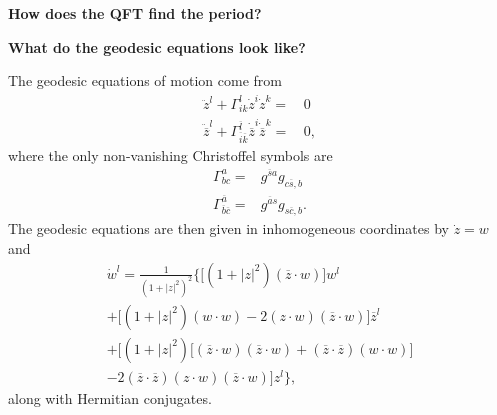 \documentclass{slides}
\begin{document}
\pagebreak



\begin{center}
\textbf{How does the QFT find the period?}
\end{center}

\pagebreak


\begin{center}
\textbf{What do the geodesic equations look like?}
\end{center}

The geodesic equations of motion come from
\begin{equation*}
\begin{split}
    \ddot{z}^l + \Gamma^l_{ik}\dot{z}^i\dot{z}^k =&\, 0\\
    \ddot{\overline{z}}^l + \Gamma^{\overline{l}}_{\overline{i}\overline{k}}
            \dot{\overline{z}}^i\dot{\overline{z}}^k =&\, 0,
\end{split}
\label{e:geodesics}
\end{equation*}
where the only non-vanishing Christoffel symbols are
\begin{equation*}
\begin{split}
    \Gamma^a_{bc} =& g^{\overline{s}a} g_{c\overline{s},b}\\
    \Gamma^{\overline{a}}_{\overline{b}\overline{c}} =& g^{\overline{a}s} 
                            g_{s\overline{c},b}.
\end{split}
\label{e:xsymb}
\end{equation*}
The geodesic equations are then given in inhomogeneous coordinates by
$\dot{z}=w$ and
\begin{multline*}
    \dot{w}^l = \frac{1}{ \left( 1 + \left| z\right|^2 \right)^2 }
        \biggl\lbrace
            \biggl[ \left( 1 + \left| z\right|^2 \right) 
                    \left( \overline{z}\cdot w \right)
            \biggr] w^l\\
            +
            \biggl[ \left( 1 + \left| z\right|^2 \right)\left( w\cdot w \right)
                    - 2\left( z\cdot w \right)\left( \overline{z}\cdot w \right)
            \biggr] \overline{z}^l\\
            +
            \biggl[ \left( 1 + \left| z\right|^2 \right) 
                    \bigl[ 
                      \left(\overline{z}\cdot w\right)\left(\overline{z}\cdot w\right)
                      +\left(\overline{z}\cdot\overline{z}\right)\left(w\cdot w\right)
                    \bigr]\\
                    - 2\left(\overline{z}\cdot\overline{z}\right) 
                        \left( z\cdot w \right)\left( \overline{z}\cdot w \right)
            \biggr] z^l
        \biggr\rbrace,
\label{e:detailedGeodesics}
\end{multline*}
along with Hermitian conjugates.


\pagebreak
\end{document}
